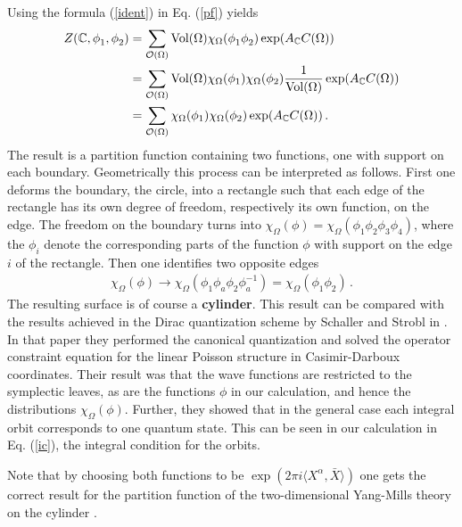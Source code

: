 \documentclass[a4paper,twoside,11pt]{article}
\numberwithin{equation}{section}
\begin{document}
Using the formula (\ref{ident}) in Eq. (\ref{pf}) yields
\begin{align}
Z(\mathbb{C},\phi_1^{},\phi_2^{})&=\sum_{\mathcal{O}(\Omega)}{\rm Vol}(\Omega)\chi_{\Omega}(\phi_1^{}\phi_2^{})
\exp(A_{\mathbb{C}}C(\Omega))\notag\\
&=\sum_{\mathcal{O}(\Omega)}\text{Vol}(\Omega)\chi_{\Omega}(\phi_1)\chi_{\Omega}(\phi_2)\frac{1}{\text{Vol}(\Omega)}
\exp(A_{\mathbb{C}}C(\Omega)\notag)\\
&=\sum_{\mathcal{O}(\Omega)}\chi_{\Omega}(\phi_1)\chi_{\Omega}(\phi_2)\exp(A_{\mathbb{C}}C(\Omega))\,.
\end{align}
The result is a partition function containing two functions, one with support on each boundary. Geometrically 
this process can be interpreted as follows. First one deforms the boundary, the circle, into a rectangle such 
that each edge of the rectangle has its own degree of freedom, respectively its own function, on the edge. The freedom on the 
boundary turns into $\chi_\Omega(\phi)=\chi_\Omega(\phi_1\phi_2\phi_3\phi_4)$, where the 
$\phi_i$ denote the corresponding parts of the function $\phi$ with support on the edge $i$ of the 
rectangle. Then one identifies two opposite edges
\begin{gather}
\chi_\Omega(\phi)\rightarrow\chi_\Omega(\phi_1\phi_a\phi_2\phi_a^{-1})=\chi_\Omega(\phi_1\phi_2)\,.
\end{gather}
The resulting surface is of course a {\bf cylinder}. This result can be compared with the results 
achieved in the Dirac quantization scheme by Schaller and Strobl in \cite{SS}. In that paper they performed 
the canonical quantization and solved the operator constraint equation for the linear Poisson structure in 
Casimir-Darboux coordinates. Their result was that the wave functions are restricted to the symplectic leaves, 
as are the functions $\phi$ in our calculation, and hence the distributions $\chi_\Omega(\phi)$. Further, they 
showed that in the general case each integral orbit corresponds to one quantum state. 
This can be seen in our calculation in Eq. (\ref{ic}), the integral condition for the orbits.

Note that by choosing both functions to be $\exp(2\pi i\langle X^\alpha,\bar{X}\rangle)$ one gets the correct
result for the partition function of the two-dimensional Yang-Mills theory on the cylinder \cite{BT}.
\end{document}
